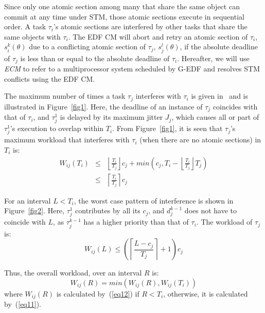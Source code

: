 \documentclass[letter]{sig-alternate}
\begin{document}
Since only one atomic section among many that share the same object can commit at any time under STM, those atomic sections execute in sequential order.  A task $\tau_{i}$'s atomic sections are interfered by other tasks that share the same objects with $\tau_{i}$.  
The EDF CM will abort and retry an atomic section of $\tau_i$, $s_i^k(\theta)$ due to a conflicting atomic section of $\tau_j$, $s_j^l(\theta)$, if the absolute deadline of $\tau_j$ is less than or equal to the absolute deadline of $\tau_i$. 
Hereafter, we will use \emph{ECM} to refer to a multiprocessor system scheduled by G-EDF and resolves STM conflicts using the EDF CM. 


The maximum number of times a task $\tau_{j}$ interferes with $\tau_{i}$ is given in~\cite{key-2} and is illustrated in Figure~\ref{fig1}. 
Here, the deadline of an instance of $\tau_{j}$ coincides
with that of $\tau_{i}$, and $\tau_{j}^{1}$ is delayed by its maximum
jitter $J_{j}$, which causes all or part of $\tau_{j}^1$'s execution to overlap within $T_i$. From Figure~\ref{fig1}, it is seen that $\tau_{j}$'s maximum workload that interferes with $\tau_{i}$ (when there are no atomic sections) in $T_{i}$ is:
\begin{eqnarray}
W_{ij}\left(T_{i}\right) & \le & \left\lfloor\frac{T_{i}}{T_{j}}\right\rfloor c_{j}+min\left(c_{j},T_{i}-\left\lfloor\frac{T_{i}}{T_{j}}\right\rfloor T_{j}\right)\nonumber \\
 & \le & \left\lceil\frac{T_{i}}{T_{j}}\right\rceil c_{j}\label{eq11}\end{eqnarray}

For an interval $L<T_{i}$, the worst case pattern of interference is shown in Figure~\ref{fig2}. Here, $\tau_{j}^{1}$ contributes by all its $c_j$, and $d_j^{k-1}$ does not have to coincide with $L$, as $\tau_j^{k-1}$ has a higher priority than that of $\tau_{i}$. The workload of $\tau_{j}$ is:
\begin{equation}
W_{ij}\left(L\right)\le \left(\left\lceil\frac{L-c_{j}}{T_{j}}\right\rceil +1\right)c_{j}
\label{eq12}\end{equation}

Thus, the overall workload, over an interval $R$ is:
\begin{equation}
W_{ij}\left(R\right)=min\left(W_{ij}\left(R\right),W_{ij}\left(T_{i}\right)\right)\label{eq13}\end{equation}
where $W_{ij}(R)$ is calculated by~(\ref{eq12}) if $R<T_i$, otherwise, it is calculated by~(\ref{eq11}).
\end{document}
